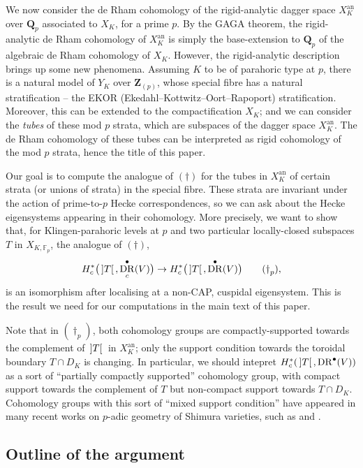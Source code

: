 \documentclass[cjm]{ipart}
\theoremstyle{plain}
\theoremstyle{remark}
\DeclareMathOperator{\DR}{DR}
\DeclarePairedDelimiter{\tb}{{\,]}}{{[\, }} %
\newcommand{\QQ}{\mathbf{Q}}
\newcommand{\Qp}{\QQ_p}
\newcommand{\ZZ}{\mathbf{Z}}
\numberwithin{equation}{subsection}
\begin{document}
  We now consider the de Rham cohomology of the rigid-analytic dagger space $X_K^{\mathrm{an}}$ over $\Qp$ associated to $X_K$, for a prime $p$. By the GAGA theorem, the rigid-analytic de Rham cohomology of $X_K^{\mathrm{an}}$ is simply the base-extension to $\Qp$ of the algebraic de Rham cohomology of $X_K$. However, the rigid-analytic description brings up some new phenomena. Assuming $K$ to be of parahoric type at $p$, there is a natural model of $Y_K$ over $\ZZ_{(p)}$, whose special fibre has a natural stratification -- the EKOR (Ekedahl--Kottwitz--Oort--Rapoport) stratification. Moreover, this can be extended to the compactification $X_K$; and we can consider the \emph{tubes} of these mod $p$ strata, which are subspaces of the dagger space $X_K^{\mathrm{an}}$. The de Rham cohomology of these tubes can be interpreted as rigid cohomology of the mod $p$ strata, hence the title of this paper.

  Our goal is to compute the analogue of $(\dag)$ for the tubes in $X_K^{\mathrm{an}}$ of certain strata (or unions of strata) in the special fibre. These strata are invariant under the action of prime-to-$p$ Hecke correspondences, so we can ask about the Hecke eigensystems appearing in their cohomology. More precisely, we want to show that, for Klingen-parahoric levels at $p$ and two particular locally-closed subspaces $T$ in $X_{K, \mathbb{F}_p}$, the analogue of $(\dag)$,
  \[ H^*_c\big(\tb{T}, \DR^\bullet_c(V)\big) \to H^*_c\big(\tb{T}, \DR^\bullet(V)\big) \tag{$\dag_p$}, \]
  is an isomorphism after localising at a non-CAP, cuspidal eigensystem. This is the result we need for our computations in the main text of this paper.

  \begin{remark}
   Note that in $(\dag_p)$, both cohomology groups are compactly-supported towards the complement of $\tb{T}$ in $X_K^{\mathrm{an}}$; only the support condition towards the toroidal boundary $T \cap D_K$ is changing. In particular, we should intepret $H^*_c(\tb{T}, \DR^\bullet(V))$ as a sort of ``partially compactly supported'' cohomology group, with compact support towards the complement of $T$ but non-compact support towards $T \cap D_K$. Cohomology groups with this sort of ``mixed support condition'' have appeared in many recent works on $p$-adic geometry of Shimura varieties, such as \cite{HLTT16} and \cite{boxerpilloni20}.
  \end{remark}

 \subsection{Outline of the argument}
\end{document}
